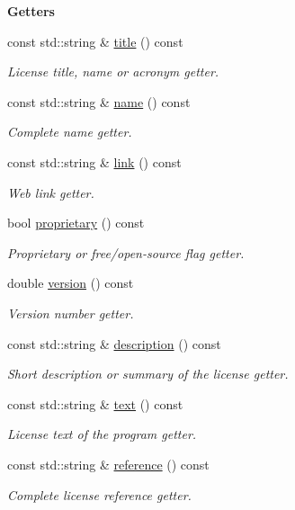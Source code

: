 \begin{Indent}{\bf Getters}\par
\begin{DoxyCompactItemize}
\item 
const std\-::string \& \hyperlink{exceptionmagrathea_1_1AboutLicense_a9540bd91bf92d369ab63c56f73390cfe}{title} () const 
\begin{DoxyCompactList}\small\item\em License title, name or acronym getter. \end{DoxyCompactList}\item 
const std\-::string \& \hyperlink{exceptionmagrathea_1_1AboutLicense_abcba63f5d3ffb9d830491c673c02940f}{name} () const 
\begin{DoxyCompactList}\small\item\em Complete name getter. \end{DoxyCompactList}\item 
const std\-::string \& \hyperlink{exceptionmagrathea_1_1AboutLicense_a67c5b15e442a683cae85490516b20793}{link} () const 
\begin{DoxyCompactList}\small\item\em Web link getter. \end{DoxyCompactList}\item 
bool \hyperlink{exceptionmagrathea_1_1AboutLicense_a34f24ae9d81244368807811f0bd01b5f}{proprietary} () const 
\begin{DoxyCompactList}\small\item\em Proprietary or free/open-\/source flag getter. \end{DoxyCompactList}\item 
double \hyperlink{exceptionmagrathea_1_1AboutLicense_aa191f2959b6ded2ab40545939fc4c258}{version} () const 
\begin{DoxyCompactList}\small\item\em Version number getter. \end{DoxyCompactList}\item 
const std\-::string \& \hyperlink{exceptionmagrathea_1_1AboutLicense_a022dfb624b8c9fe27d30e156c7902fc4}{description} () const 
\begin{DoxyCompactList}\small\item\em Short description or summary of the license getter. \end{DoxyCompactList}\item 
const std\-::string \& \hyperlink{exceptionmagrathea_1_1AboutLicense_af14a66dd7e7c7e94b4c6672851ebf3d5}{text} () const 
\begin{DoxyCompactList}\small\item\em License text of the program getter. \end{DoxyCompactList}\item 
const std\-::string \& \hyperlink{exceptionmagrathea_1_1AboutLicense_a1d4576310ec41d21d79c80d1bf361bea}{reference} () const 
\begin{DoxyCompactList}\small\item\em Complete license reference getter. \end{DoxyCompactList}\end{DoxyCompactItemize}
\end{Indent}
